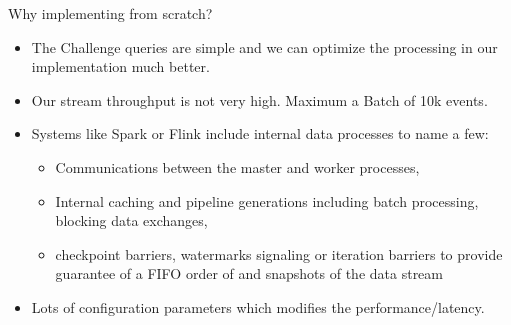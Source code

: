 \documentclass[9pt]{beamer}
\begin{document}
\begin{frame}[fragile]{Why implementing from scratch? }


    \begin{itemize}
            
        \item The Challenge queries are simple and we can optimize the processing in our implementation much better. 
        \item Our stream throughput is not very high. Maximum a Batch of 10k events. 
        

        \item Systems like Spark or Flink include internal data processes to name a few: 
        
        \begin{itemize}
            \item Communications between the master and worker processes,
            \item Internal caching and pipeline generations including batch processing, blocking data exchanges, 
            \item checkpoint barriers, watermarks signaling or iteration barriers to provide guarantee of a FIFO order of and 
            snapshots of the data stream
   
        \end{itemize}
         
     
    
        \item Lots of configuration parameters which modifies the performance/latency. 
        

\end{itemize}
\end{frame}
\end{document}
